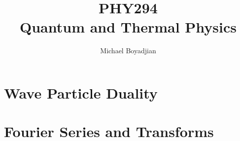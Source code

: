 \documentclass[11pt]{article}
\begin{document}
\title{PHY294 \\ Quantum and Thermal Physics}
\author{Michael Boyadjian}
\maketitle
\pagebreak

\tableofcontents

\pagebreak

\bigskip
\bigskip
\bigskip

\section{Wave Particle Duality}

\section{Fourier Series and Transforms}
\end{document}
